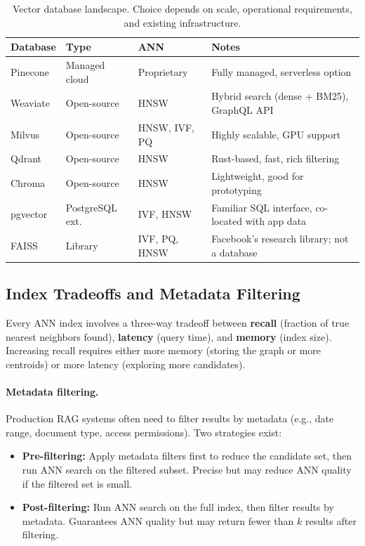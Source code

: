 \begin{table}[H]
\centering
\small
\begin{tabularx}{\textwidth}{@{}l l l X@{}}
\toprule
\textbf{Database} & \textbf{Type} & \textbf{ANN} & \textbf{Notes} \\
\midrule
Pinecone    & Managed cloud   & Proprietary   & Fully managed, serverless option \\
Weaviate    & Open-source     & HNSW          & Hybrid search (dense + BM25), GraphQL API \\
Milvus      & Open-source     & HNSW, IVF, PQ & Highly scalable, GPU support \\
Qdrant      & Open-source     & HNSW          & Rust-based, fast, rich filtering \\
Chroma      & Open-source     & HNSW          & Lightweight, good for prototyping \\
pgvector    & PostgreSQL ext. & IVF, HNSW     & Familiar SQL interface, co-located with app data \\
FAISS       & Library         & IVF, PQ, HNSW & Facebook's research library; not a database \\
\bottomrule
\end{tabularx}
\caption{Vector database landscape.  Choice depends on scale, operational
requirements, and existing infrastructure.}
\label{tab:vector-dbs}
\end{table}

\subsection{Index Tradeoffs and Metadata Filtering}

Every ANN index involves a three-way tradeoff between \textbf{recall}
(fraction of true nearest neighbors found), \textbf{latency} (query time),
and \textbf{memory} (index size).  Increasing recall requires either more
memory (storing the graph or more centroids) or more latency (exploring more
candidates).

\paragraph{Metadata filtering.}
Production RAG systems often need to filter results by metadata (e.g., date
range, document type, access permissions).  Two strategies exist:

\begin{itemize}
    \item \textbf{Pre-filtering:} Apply metadata filters first to reduce the
          candidate set, then run ANN search on the filtered subset.  Precise
          but may reduce ANN quality if the filtered set is small.
    \item \textbf{Post-filtering:} Run ANN search on the full index, then
          filter results by metadata.  Guarantees ANN quality but may return
          fewer than $k$ results after filtering.
\end{itemize}

